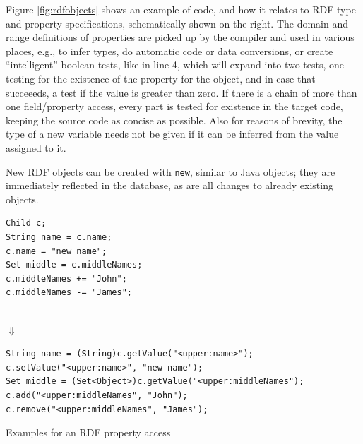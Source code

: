 Figure \ref{fig:rdfobjects} shows an example of \vonda code, and how it relates
to RDF type and property specifications, schematically shown on the right.  The
domain and range definitions of properties are picked up by the compiler and
used in various places, e.g., to infer types, do automatic code or data
conversions, or create ``intelligent'' boolean tests, like in line 4, which
will expand into two tests, one testing for the existence of the property for
the object, and in case that succeeeds, a test if the value is greater than
zero. If there is a chain of more than one field/property access, every part is
tested for existence in the target code, keeping the source code as concise as
possible. Also for reasons of brevity, the type of a new variable needs not be
given if it can be inferred from the value assigned to it.

New RDF objects can be created with \texttt{new}, similar to Java objects; they
are immediately reflected in the database, as are all changes to already
existing objects.



\begin{table}[htbp]
  \centering
\begin{minipage}[t]{0.355\textwidth}
\begin{lstlisting}
Child c;
String name = c.name;
c.name = "new name";
Set middle = c.middleNames;
c.middleNames += "John";
c.middleNames -= "James";
\end{lstlisting}
\end{minipage}\\{\Large$\Downarrow$}\\
\begin{minipage}[t]{0.8\textwidth}
\begin{lstlisting}
String name = (String)c.getValue("<upper:name>");
c.setValue("<upper:name>", "new name");
Set middle = (Set<Object>)c.getValue("<upper:middleNames");
c.add("<upper:middleNames", "John");
c.remove("<upper:middleNames", "James");
\end{lstlisting}
\end{minipage}
  \caption{Examples for an RDF property access}
  \label{tab:property-access}
\end{table}

